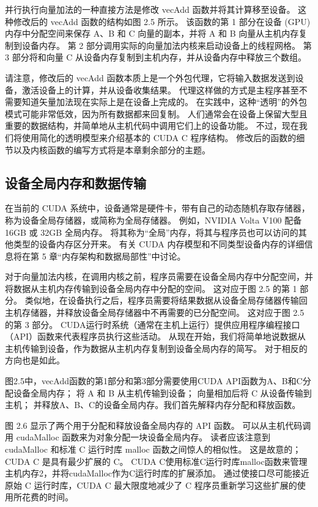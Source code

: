 并行执行向量加法的一种直接方法是修改 vecAdd 函数并将其计算移至设备。 这种修改后的 vecAdd 函数的结构如图 2.5 所示。 该函数的第 1 部分在设备 (GPU) 内存中分配空间来保存 A、B 和 C 向量的副本，并将 A 和 B 向量从主机内存复制到设备内存。 第 2 部分调用实际的向量加法内核来启动设备上的线程网格。 第 3 部分将和向量 C 从设备内存复制到主机内存，并从设备内存中释放三个数组。

请注意，修改后的 vecAdd 函数本质上是一个外包代理，它将输入数据发送到设备，激活设备上的计算，并从设备收集结果。 代理这样做的方式是主程序甚至不需要知道矢量加法现在实际上是在设备上完成的。 在实践中，这种“透明”的外包模式可能非常低效，因为所有数据都来回复制。 人们通常会在设备上保留大型且重要的数据结构，并简单地从主机代码中调用它们上的设备功能。 不过，现在我们将使用简化的透明模型来介绍基本的 CUDA C 程序结构。 修改后的函数的细节以及内核函数的编写方式将是本章剩余部分的主题。

\subsection{设备全局内存和数据传输}
在当前的 CUDA 系统中，设备通常是硬件卡，带有自己的动态随机存取存储器，称为设备全局存储器，或简称为全局存储器。 例如，NVIDIA Volta V100 配备 16GB 或 32GB 全局内存。 将其称为“全局”内存，将其与程序员也可以访问的其他类型的设备内存区分开来。 有关 CUDA 内存模型和不同类型设备内存的详细信息将在第 5 章“内存架构和数据局部性”中讨论。

对于向量加法内核，在调用内核之前，程序员需要在设备全局内存中分配空间，并将数据从主机内存传输到设备全局内存中分配的空间。 这对应于图 2.5 的第 1 部分。 类似地，在设备执行之后，程序员需要将结果数据从设备全局存储器传输回主机存储器，并释放设备全局存储器中不再需要的已分配空间。 这对应于图 2.5 的第 3 部分。 CUDA运行时系统（通常在主机上运行）提供应用程序编程接口（API）函数来代表程序员执行这些活动。 从现在开始，我们将简单地说数据从主机传输到设备，作为数据从主机内存复制到设备全局内存的简写。 对于相反的方向也是如此。

图2.5中，vecAdd函数的第1部分和第3部分需要使用CUDA API函数为A、B和C分配设备全局内存； 将 A 和 B 从主机传输到设备； 向量相加后将 C 从设备传输到主机； 并释放A、B、C的设备全局内存。我们首先解释内存分配和释放函数。

图 2.6 显示了两个用于分配和释放设备全局内存的 API 函数。 可以从主机代码调用 cudaMalloc 函数来为对象分配一块设备全局内存。 读者应该注意到 cudaMalloc 和标准 C 运行时库 malloc 函数之间惊人的相似性。 这是故意的； CUDA C 是具有最少扩展的 C。 CUDA C使用标准C运行时库malloc函数来管理主机内存2，并将cudaMalloc作为C运行时库的扩展添加。 通过使接口尽可能接近原始 C 运行时库，CUDA C 最大限度地减少了 C 程序员重新学习这些扩展的使用所花费的时间。


